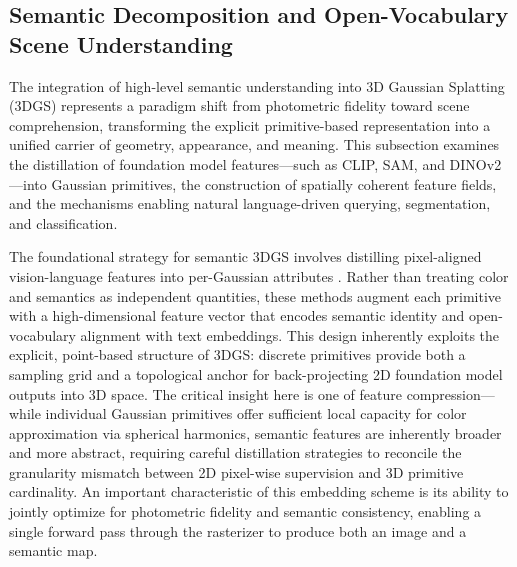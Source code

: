 \documentclass[11pt,a4paper]{article}
\begin{document}
\subsection{Semantic Decomposition and Open-Vocabulary Scene Understanding}


The integration of high-level semantic understanding into 3D Gaussian Splatting (3DGS) represents a paradigm shift from photometric fidelity toward scene comprehension, transforming the explicit primitive-based representation into a unified carrier of geometry, appearance, and meaning. This subsection examines the distillation of foundation model features---such as CLIP, SAM, and DINOv2---into Gaussian primitives, the construction of spatially coherent feature fields, and the mechanisms enabling natural language-driven querying, segmentation, and classification.

The foundational strategy for semantic 3DGS involves distilling pixel-aligned vision-language features into per-Gaussian attributes \cite{arxiv:2605.15010v2}. Rather than treating color and semantics as independent quantities, these methods augment each primitive with a high-dimensional feature vector that encodes semantic identity and open-vocabulary alignment with text embeddings. This design inherently exploits the explicit, point-based structure of 3DGS: discrete primitives provide both a sampling grid and a topological anchor for back-projecting 2D foundation model outputs into 3D space. The critical insight here is one of feature compression---while individual Gaussian primitives offer sufficient local capacity for color approximation via spherical harmonics, semantic features are inherently broader and more abstract, requiring careful distillation strategies to reconcile the granularity mismatch between 2D pixel-wise supervision and 3D primitive cardinality. An important characteristic of this embedding scheme is its ability to jointly optimize for photometric fidelity and semantic consistency, enabling a single forward pass through the rasterizer to produce both an image and a semantic map.
\end{document}
